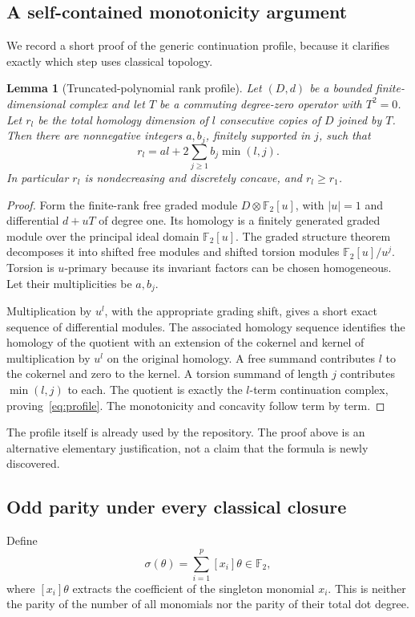 \documentclass[11pt]{article}
\newtheorem{lemma}[theorem]{Lemma}
\theoremstyle{definition}\newtheorem{definition}[theorem]{Definition}\newtheorem{example}[theorem]{Example}
\theoremstyle{remark}\newtheorem{remark}[theorem]{Remark}
\newcommand{\F}{{\mathbb{F}_2}}
\begin{document}
\subsection{A self-contained monotonicity argument}
We record a short proof of the generic continuation profile, because it clarifies exactly which step uses classical topology.
\begin{lemma}[Truncated-polynomial rank profile]\label{lem:profile}
Let $(D,d)$ be a bounded finite-dimensional complex and let $T$ be a commuting degree-zero operator with $T^2=0$. Let $r_l$ be the total homology dimension of $l$ consecutive copies of $D$ joined by $T$. Then there are nonnegative integers $a,b_j$, finitely supported in $j$, such that
\begin{equation}\label{eq:profile}
 r_l=al+2\sum_{j\ge1}b_j\min(l,j).
\end{equation}
In particular $r_l$ is nondecreasing and discretely concave, and $r_l\ge r_1$.
\end{lemma}
\begin{proof}
Form the finite-rank free graded module $D\otimes\F[u]$, with $|u|=1$ and differential $d+uT$ of degree one. Its homology is a finitely generated graded module over the principal ideal domain $\F[u]$. The graded structure theorem decomposes it into shifted free modules and shifted torsion modules $\F[u]/u^j$. Torsion is $u$-primary because its invariant factors can be chosen homogeneous. Let their multiplicities be $a,b_j$.

Multiplication by $u^l$, with the appropriate grading shift, gives a short exact sequence of differential modules. The associated homology sequence identifies the homology of the quotient with an extension of the cokernel and kernel of multiplication by $u^l$ on the original homology. A free summand contributes $l$ to the cokernel and zero to the kernel. A torsion summand of length $j$ contributes $\min(l,j)$ to each. The quotient is exactly the $l$-term continuation complex, proving~\eqref{eq:profile}. The monotonicity and concavity follow term by term.
\end{proof}

The profile itself is already used by the repository. The proof above is an alternative elementary justification, not a claim that the formula is newly discovered.

\subsection{Odd parity under every classical closure}
Define
\[
 \sigma(\theta)=\sum_{i=1}^p[x_i]\theta\in\F,
\]
where $[x_i]\theta$ extracts the coefficient of the singleton monomial $x_i$. This is neither the parity of the number of all monomials nor the parity of their total dot degree.
\end{document}
